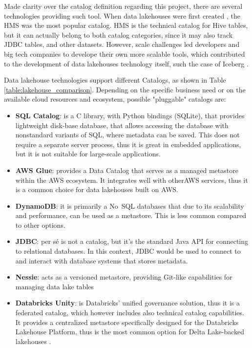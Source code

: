 Made clarity over the catalog definition regarding this project, there are several technologies providing such tool. When data lakehouses were first created \cite{rajaperumalUberEngineeringIncremental2017,shiranApacheIcebergDefinitive2024}, the \gls{HMS} was the most popular catalog. \gls{HMS} is the technical catalog for Hive tables, but it can actually belong to both catalog categories, since it may also track \gls{JDBC} tables, and other datasets. However, scale challenges led developers and big tech companies to develope their own more scalable tools, which contributed to the development of data lakehouses technology itself, such the case of Iceberg \cite{IcebergNewHadoop}.

Data lakehouse technologies support different Catalogs, as shown in Table \ref{table:lakehouse_comparison}. Depending on the specific business need or on the available cloud resources and ecosystem, possible "pluggable" catalogs are:
\begin{itemize}
    \item \textbf{SQL Catalog}: is a C library, with Python bindings (SQLite), that provides lightweight disk-base database, that allows accessing the database with nonstandard variants of \gls{SQL}, where metadata can be saved. This does not require a separate server process, thus it is great in embedded applications, but it is not suitable for large-scale applications.
    \item \textbf{\gls{AWS} Glue}: provides a Data Catalog that serves as a managed metastore within the \gls{AWS} ecosystem. It integrates well with other\gls{AWS} services, thus it is a common choice for data lakehouses built on \gls{AWS}.
    \item \textbf{DynamoDB}: it is primarily a No~\gls{SQL} databases that due to its scalability and performance, can be used as a metastore. This is less common compared to other options.
    \item \textbf{\gls{JDBC}}: per sé is not a catalog, but it's the standard Java \gls{API} for connecting to relational databases. In this context, \gls{JDBC} would be used to connect to and interact with database systems that stores metadata.
    \item \textbf{Nessie}: acts as a versioned metastore, providing Git-like capabilities for managing data lake tables
    \item \textbf{Databricks Unity}: is Databricks' unified governance solution, thus it is a federated catalog, which however includes also technical catalog capabilities. It provides a centralized metastore specifically designed for the Databricks Lakehouse Platform, thus is the most common option for Delta Lake-backed lakehouses \cite{AnnouncingDeltaLake2023}.
\end{itemize}

